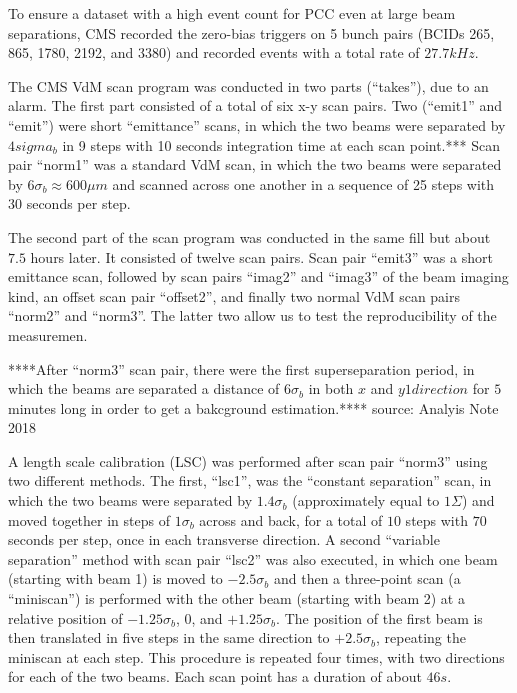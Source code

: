 To ensure a dataset with a high event count for PCC even at large beam separations, CMS recorded the zero-bias triggers on 5 bunch pairs (BCIDs 265, 865, 1780, 2192, and 3380) and recorded events with a total rate of $27.7kHz$.

The CMS VdM scan program was conducted in two parts (``takes''), due to an alarm. The first part consisted of a total of six x-y scan pairs. Two (``emit1'' and ``emit'') were short ``emittance'' scans, in which the two beams were separated by $4sigma_{b}$ in 9 steps with 10 seconds integration time at each scan point.***
Scan pair ``norm1'' was a standard VdM scan, in which the two beams were separated by $6\sigma_{b} \approx 600 \mu m$  and scanned across one another in a sequence of 25 steps with 30 seconds per step.

The second part of the scan program was conducted in the same fill but about $7.5$ hours later. It consisted of twelve scan pairs. Scan pair ``emit3'' was a short emittance scan, followed by scan pairs ``imag2'' and ``imag3'' of the beam imaging kind, an offset scan pair ``offset2'', and finally two normal VdM scan pairs ``norm2'' and ``norm3''. The latter two allow us to test the reproducibility of the measuremen.

****After ``norm3'' scan pair, there were the first superseparation period, in which the beams are separated a distance of $6 \sigma_{b}$ in both $x$ and $y1 direction$ for $5$ minutes long in order to get a bakcground estimation.**** source: Analyis Note 2018


A length scale calibration (LSC) was performed after scan pair ``norm3'' using two different methods. The first, ``lsc1'', was the ``constant separation'' scan, in which the two beams were separated by $1.4\sigma_{b}$ (approximately equal to $1\Sigma$) and moved together in steps of $1\sigma_{b}$ across and back, for a total of $10$ steps with $70$ seconds per step, once in each transverse direction. A second ``variable separation'' method with scan pair ``lsc2'' was also executed, in which one beam (starting with beam 1) is moved to $-2.5\sigma_{b}$ and then a three-point scan (a ``miniscan'') is performed with the other beam (starting with beam 2) at a relative position of $-1.25\sigma_{b}$, $0$, and $+ 1.25 \sigma_{b}$. The position of the first beam is then translated in five steps in the same direction to $+2.5 \sigma_{b}$, repeating the miniscan at each step. This procedure is repeated four times, with two directions for each of the two beams. Each scan point has a duration of about $46s$.

